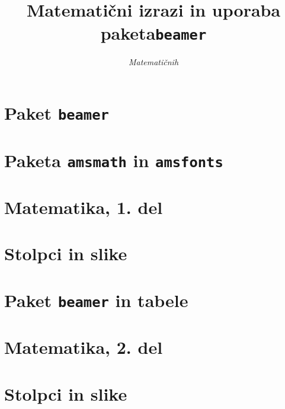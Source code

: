 \documentclass{beamer}
\title{Matematični izrazi in uporaba paketa\texttt{beamer}}
\subtitle{\emph{Matematičnih}}
\institute{Fakulteta za matematiko in fiziko}
\date{}
\begin{document}
\begin{frame}
\end{frame}
\section{Paket \texttt{beamer}}

\section{Paketa \texttt{amsmath} in \texttt{amsfonts}}

\section[Matematika, 1. del\\\large{Analiza, logika, množice}]{Matematika, 1. del}

\section{Stolpci in slike}

\section{Paket \texttt{beamer} in tabele}

\section[Matematika, 2. del\\\large{Zaporedja, algebra, grupe}]{Matematika, 2. del}

\section{Stolpci in slike}

\end{document}
